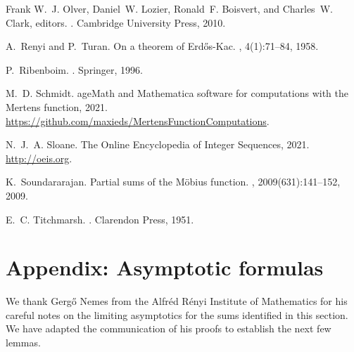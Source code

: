 \documentclass[11pt,reqno,a4letter]{article}
\numberwithin{figure}{section}
\numberwithin{table}{section}
\theoremstyle{plain}
\numberwithin{theorem}{section}
\theoremstyle{definition}
\begin{document}
\begin{thebibliography}{10}
Frank W.~J. Olver, Daniel~W. Lozier, Ronald~F. Boisvert, and Charles~W. Clark,
  editors.
.
\newblock Cambridge University Press, 2010.

A.~Renyi and P.~Turan.
\newblock On a theorem of {E}rd{\H{o}}s-{K}ac.
, 4(1):71--84, 1958.

P.~Ribenboim.
.
\newblock Springer, 1996.

M.~D. Schmidt.
age{M}ath and {M}athematica software for computations with the
  {M}ertens function, 2021.
\newblock \url{https://github.com/maxieds/MertensFunctionComputations}.

N.~J.~A. Sloane.
\newblock The {O}nline {E}ncyclopedia of {I}nteger {S}equences, 2021.
\newblock \url{http://oeis.org}.

K.~Soundararajan.
\newblock Partial sums of the {M}{\"{o}}bius function.
, 2009(631):141--152, 2009.

E.~C. Titchmarsh.
.
\newblock Clarendon Press, 1951.

\end{thebibliography}

\setcounter{section}{0} 
\renewcommand{\thesection}{\Alph{section}} 

\newpage
\section{Appendix: Asymptotic formulas} 
\label{subSection_OtherFactsAndResults} 

We thank Gerg\H{o} Nemes from the Alfr\'{e}d R\'{e}nyi Institute of Mathematics for his 
careful notes on the limiting asymptotics for the sums identified in this section. 
We have adapted the communication of his proofs to establish the next few lemmas. 
\end{document}
